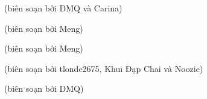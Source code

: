 \noindent

{}
\setcounter{equation}{0}


\begin{flushright}
    (biên soạn bởi DMQ và Carina)
\end{flushright}
\newpage

{\vspace{1.5mm}}
\setcounter{equation}{0}


\begin{flushright}
    (biên soạn bởi Meng)
\end{flushright}
\newpage

{}
\setcounter{equation}{0}


\begin{flushright}
   (biên soạn bởi Meng)
\end{flushright}
\newpage

{}
\setcounter{equation}{0}


\begin{flushright}
    (biên soạn bởi tlonde2675, Khui Đạp Chai và Noozie)
\end{flushright}
\newpage

{}
\setcounter{equation}{0}


\begin{flushright}
    (biên soạn bởi DMQ)
\end{flushright}



